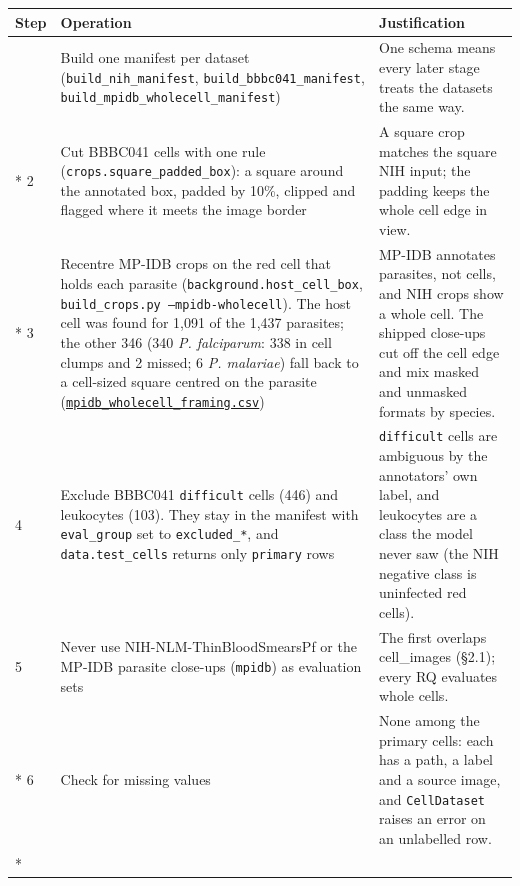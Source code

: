 \documentclass[11pt,a4paper]{article}
\begin{document}
{\small
\begin{longtable}{@{}>{\raggedright\arraybackslash\hspace{0pt}}p{25.5pt}>{\raggedright\arraybackslash\hspace{0pt}}p{185.5pt}>{\raggedright\arraybackslash\hspace{0pt}}p{113.0pt}@{}}
\toprule
Step & Operation & Justification \\
\midrule
\endhead
\bottomrule
\endfoot
\bottomrule
\endlastfoot
1 & Build one manifest per dataset (\texttt{build\_\allowbreak{}nih\_\allowbreak{}manifest}, \texttt{build\_\allowbreak{}bbbc041\_\allowbreak{}manifest}, \texttt{build\_\allowbreak{}mpidb\_\allowbreak{}wholecell\_\allowbreak{}manifest}) & One schema means every later stage treats the datasets the same way. \\*
2 & Cut BBBC041 cells with one rule (\texttt{crops.\allowbreak{}square\_\allowbreak{}padded\_\allowbreak{}box}): a square around the annotated box, padded by 10\%, clipped and flagged where it meets the image border & A square crop matches the square NIH input; the padding keeps the whole cell edge in view. \\*
3 & Recentre MP-IDB crops on the red cell that holds each parasite (\texttt{background.\allowbreak{}host\_\allowbreak{}cell\_\allowbreak{}box}, \texttt{build\_\allowbreak{}crops.\allowbreak{}py --mpidb-wholecell}). The host cell was found for 1,091 of the 1,437 parasites; the other 346 (340 \emph{P. falciparum}: 338 in cell clumps and 2 missed; 6 \emph{P. malariae}) fall back to a cell-sized square centred on the parasite (\href{https://gitlab.uvt.nl/capstone/2026-fall/u927271/-/blob/v1.0-final/outputs/tables/mpidb_wholecell_framing.csv}{\texttt{mpidb\_\allowbreak{}wholecell\_\allowbreak{}framing.\allowbreak{}csv}}) & MP-IDB annotates parasites, not cells, and NIH crops show a whole cell. The shipped close-ups cut off the cell edge and mix masked and unmasked formats by species. \\
4 & Exclude BBBC041 \texttt{difficult} cells (446) and leukocytes (103). They stay in the manifest with \texttt{eval\_\allowbreak{}group} set to \texttt{excluded\_\allowbreak{}*}, and \texttt{data.\allowbreak{}test\_\allowbreak{}cells} returns only \texttt{primary} rows & \texttt{difficult} cells are ambiguous by the annotators' own label, and leukocytes are a class the model never saw (the NIH negative class is uninfected red cells). \\
5 & Never use NIH-NLM-ThinBloodSmearsPf or the MP-IDB parasite close-ups (\texttt{mpidb}) as evaluation sets & The first overlaps cell\_\allowbreak{}images (\S{}2.1); every RQ evaluates whole cells. \\*
6 & Check for missing values & None among the primary cells: each has a path, a label and a source image, and \texttt{CellDataset} raises an error on an unlabelled row. \\*
\end{longtable}}
\addtocounter{table}{-1}
\end{document}
